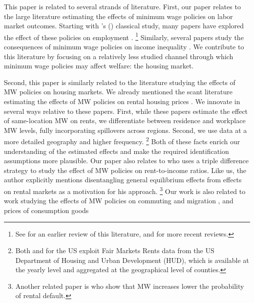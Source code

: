 
This paper is related to several strands of literature.
First, our paper relates to the large literature estimating the effects of minimum 
wage policies on labor market outcomes.
Starting with \citeauthor{CardKrueger1994}'s (\citeyear{CardKrueger1994}) classical 
study, many papers have explored the effect of these policies on employment
\parencite[some recent examples include][]{MeerWest2016,CegnizEtAl2019}.%
\footnote{See \textcite{Neumark2006} for an earlier review of this literature,
and \textcite{Dube2019, NeumarkShirley2021} for more recent reviews.}
Similarly, several papers study the consequences of minimum wage policies on 
income inequality \parencite{Lee1999, AutorEtAl2016}.
We contribute to this literature by focusing on a relatively less studied channel
through which minimum wage policies may affect welfare: the housing market.

Second, this paper is similarly related to the literature studying the effects 
of MW policies on housing markets.
We already mentioned the scant literature estimating the effects of MW policies
on rental housing prices \parencite{Tidemann2018, Yamagishi2021}.
We innovate in several ways relative to these papers.
First, while these papers estimate the effect of same-location MW on rents, we 
differentiate between residence and workplace MW levels, fully incorporating
spillovers across regions.
Second, we use data at a more detailed geography and higher frequency.%
\footnote{Both \textcite{Tidemann2018} and \textcite{Yamagishi2019} for the US 
exploit Fair Markets Rents data from the US Department of Housing and Urban 
Development (HUD), which is available at the yearly level and aggregated at the
geographical level of counties.}
Both of these facts enrich our understanding of the estimated effects and make 
the required identification assumptions more plausible.
Our paper also relates to \textcite{Hughes2020} who uses a triple difference 
strategy to study the effect of MW policies on rent-to-income ratios. Like us, 
the author explicitly mentions disentangling general equilibrium effects from 
effects on rental markets as a motivation for his approach.
\footnote{Another related paper is \textcite{AgarwalEtAl2019} who show that MW
increases lower the probability of rental default.}
Our work is also related to work studying the effects of MW policies on commuting
and migration \parencite{Cadena2014,Monras2019,PerezPerez2021}, and prices of 
consumption goods \parencite{AllegrettoReich2018,Leung2021}

